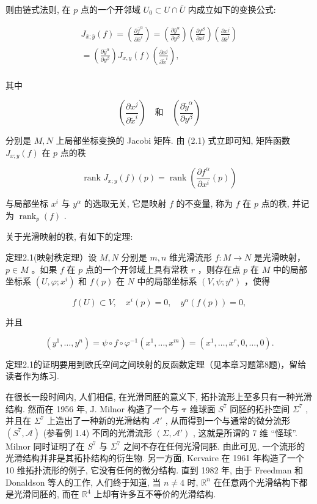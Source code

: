 则由链式法则, 在  $p$  点的一个开邻域  $U_{0} \subset U \cap \bar{U}$  内成立如下的变换公式:

$$
\begin{array}{l} J _ {\bar {x}; \bar {y}} (f) = \left(\frac {\partial \bar {f} ^ {\alpha}}{\partial \bar {x} ^ {i}}\right) = \left(\frac {\partial \bar {y} ^ {\alpha}}{\partial y ^ {\beta}}\right) \left(\frac {\partial f ^ {\beta}}{\partial x ^ {j}}\right) \left(\frac {\partial x ^ {j}}{\partial \bar {x} ^ {i}}\right) \\ = \left(\frac {\partial \bar {y} ^ {\alpha}}{\partial y ^ {\beta}}\right) J _ {x, y} (f) \left(\frac {\partial x ^ {j}}{\partial \tilde {x} ^ {i}}\right), %
\\ \end{array}
$$

其中

$$
\left({\frac {\partial x ^ {j}}{\partial \tilde {x} ^ {i}}}\right) \quad {\text {和}} \quad \left({\frac {\partial \tilde {y} ^ {\alpha}}{\partial y ^ {\beta}}}\right)
$$

分别是  $M, N$  上局部坐标变换的 Jacobi 矩阵. 由 (2.1) 式立即可知, 矩阵函数  $J_{x;y}(f)$  在  $p$  点的秩

$$
\operatorname {r a n k} J _ {x; y} (f) (p) = \operatorname {r a n k} \left(\frac {\partial f ^ {\alpha}}{\partial x ^ {i}} (p)\right)
$$

与局部坐标  $x^i$  与  $y^\alpha$  的选取无关, 它是映射  $f$  的不变量, 称为  $f$  在  $p$  点的秩, 并记为  $\operatorname{rank}_p(f)$ .

关于光滑映射的秩, 有如下的定理:

定理2.1(映射秩定理）设  $M, N$  分别是  $m, n$  维光滑流形  $f: M \to N$  是光滑映射， $p \in M$ 。如果  $f$  在  $p$  点的一个开邻域上具有常秩  $r$ ，则存在点  $p$  在  $M$  中的局部坐标系  $(U, \varphi; x^i)$  和  $f(p)$  在  $N$  中的局部坐标系  $(V, \psi; y^\alpha)$ ，使得

$$
f (U) \subset V, \quad x ^ {i} (p) = 0, \quad y ^ {\alpha} (f (p)) = 0,
$$

并且

$$
(y ^ {1}, \dots , y ^ {n}) = \psi \circ f \circ \varphi^ {- 1} (x ^ {1}, \dots , x ^ {m}) = (x ^ {1}, \dots , x ^ {r}, 0, \dots , 0).
$$

定理2.1的证明要用到欧氏空间之间映射的反函数定理（见本章习题第8题)，留给读者作为练习.

在很长一段时间内, 人们相信, 在光滑同胚的意义下, 拓扑流形上至多只有一种光滑结构. 然而在 1956 年, J. Milnor 构造了一个与  $\pmb{\tau}$  维球面  $S^7$  同胚的拓扑空间  $\Sigma^7$ , 并且在  $\Sigma^7$  上造出了一种新的光滑结构  $\mathcal{A}'$ , 从而得到一个与通常的微分流形  $(S^7, \mathcal{A})$  (参看例 1.4) 不同的光滑流形  $(\Sigma, \mathcal{A}')$ , 这就是所谓的 7 维 “怪球”. Milnor 同时证明了在  $S^7$  与  $\Sigma^7$  之间不存在任何光滑同胚. 由此可见, 一个流形的光滑结构并非是其拓扑结构的衍生物. 另一方面, Kervaire 在 1961 年构造了一个 10 维拓扑流形的例子, 它没有任何的微分结构. 直到 1982 年, 由于 Freedman 和 Donaldson 等人的工作, 人们终于知道, 当  $n \neq 4$  时,  $\mathbb{R}^n$  在任意两个光滑结构下都是光滑同胚的, 而在  $\mathbb{R}^4$  上却有许多互不等价的光滑结构.

